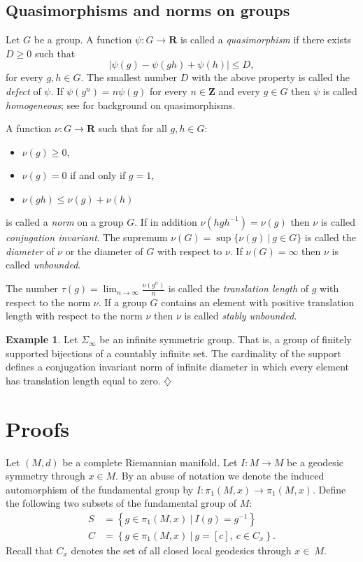 \documentclass[12pt]{amsart}
\newcommand{\B}[1]{{\mathbf #1}}
\theoremstyle{definition}
\newtheorem{example}[subsection]{Example}
\theoremstyle{remark}
\numberwithin{figure}{section}
\numberwithin{table}{section}
\numberwithin{equation}{section}
\begin{document}
\subsection{Quasimorphisms and norms on groups}
Let $G$ be a group. A function $\psi\colon G\to \B R$ is called
a {\em quasimorphism} if there exists $D\geq 0$ such that
$$
|\psi(g) - \psi(gh) + \psi(h)| \leq D,
$$
for every $g,h\in G$. The smallest number $D$ with the above
property is called the {\em defect} of $\psi$. If $\psi(g^n)=n\psi(g)$
for every $n\in \B Z$ and every $g\in G$ then $\psi$ is called
{\em homogeneous}; see \cite{MR2527432} for background on quasimorphisms.

A function $\nu\colon G\to \B R$ such that for all $g,h\in G$:
\begin{itemize}
\item $\nu(g)\geq 0$,
\item $\nu(g) = 0 $ if and only if $g=1$,
\item $\nu(gh)\leq \nu(g)+\nu(h)$
\end{itemize}
is called a {\em norm} on a group $G$. If in addition
$\nu(hgh^{-1})=\nu(g)$ then $\nu$ is called {\em conjugation invariant}.
The supremum $\nu(G)=\sup\{\nu(g)\ |\ g\in G\}$ is called the
{\em diameter} of $\nu$ or the diameter of $G$ with respect to $\nu$.
If $\nu(G)=\infty$ then $\nu$ is called {\em unbounded}.


The number $\tau(g) = \lim_{n\to \infty}\frac{\nu(g^n)}{n}$ is called
the {\em translation length} of $g$ with respect to the norm $\nu$.
If a group $G$ contains an element with positive translation length
with respect to the norm $\nu$ then $\nu$ is called {\em stably unbounded}.

\begin{example}\label{E:}
Let $\Sigma_{\infty}$ be an infinite symmetric group. That is, a group 
of finitely supported bijections of a countably infinite set. The cardinality
of the support defines a conjugation invariant norm of infinite diameter
in which every element has translation length equal to zero. 
\hfill $\diamondsuit$
\end{example}


\section{Proofs}\label{S:proofs}
Let $(M,d)$ be a complete Riemannian manifold. Let $I\colon M\to M$
be a geodesic symmetry through $x\in M$. By an abuse of notation we denote the
induced automorphism of the fundamental group by $I\colon \pi_1(M,x)\to
\pi_1(M,x)$.  Define the following two subsets of the fundamental group of $M$:
\begin{align*}
S &= \left\{ g\in \pi_1(M,x) \ |\ I(g) = g^{-1}\right\}\\
C &= \left\{ g\in \pi_1(M,x) \ |\ g = [c], \ c\in C_x\right \}.
\end{align*}
Recall that $C_x$ denotes the set of all closed local geodesics through 
$x\in~M$.
\end{document}
